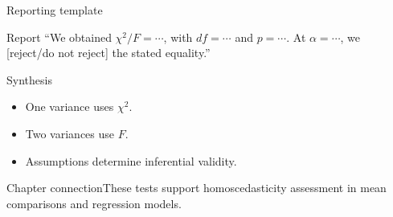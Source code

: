 \documentclass[10pt,aspectratio=169]{beamer}
\begin{document}
\begin{frame}{Reporting template}\small\begin{block}{Report} ``We obtained $\chi^2/F=\cdots$, with $df=\cdots$ and $p=\cdots$. At $\alpha=\cdots$, we [reject/do not reject] the stated equality.''\end{block}\end{frame}
\begin{frame}{Synthesis}\small\begin{itemize}\item One variance uses $\chi^2$.\item Two variances use $F$.\item Assumptions determine inferential validity.\end{itemize}\end{frame}
\begin{frame}{Chapter connection}\small These tests support homoscedasticity assessment in mean comparisons and regression models.\end{frame}
\end{document}
